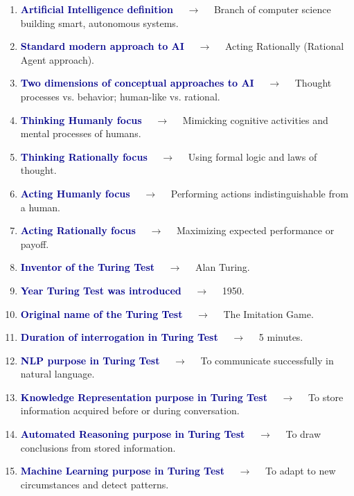 \documentclass[11pt,a4paper]{article}
\begin{document}
\begin{enumerate}[label=\arabic*., leftmargin=*, labelsep=0.8em, itemsep=0.35em, parsep=0.1em, topsep=0.2em]
  \item \textcolor{darkblue}{\textbf{Artificial Intelligence definition}} $\quad\to\quad$ Branch of computer science building smart, autonomous systems.
  \item \textcolor{darkblue}{\textbf{Standard modern approach to AI}} $\quad\to\quad$ Acting Rationally (Rational Agent approach).
  \item \textcolor{darkblue}{\textbf{Two dimensions of conceptual approaches to AI}} $\quad\to\quad$ Thought processes vs. behavior; human-like vs. rational.
  \item \textcolor{darkblue}{\textbf{Thinking Humanly focus}} $\quad\to\quad$ Mimicking cognitive activities and mental processes of humans.
  \item \textcolor{darkblue}{\textbf{Thinking Rationally focus}} $\quad\to\quad$ Using formal logic and laws of thought.
  \item \textcolor{darkblue}{\textbf{Acting Humanly focus}} $\quad\to\quad$ Performing actions indistinguishable from a human.
  \item \textcolor{darkblue}{\textbf{Acting Rationally focus}} $\quad\to\quad$ Maximizing expected performance or payoff.
  \item \textcolor{darkblue}{\textbf{Inventor of the Turing Test}} $\quad\to\quad$ Alan Turing.
  \item \textcolor{darkblue}{\textbf{Year Turing Test was introduced}} $\quad\to\quad$ 1950.
  \item \textcolor{darkblue}{\textbf{Original name of the Turing Test}} $\quad\to\quad$ The Imitation Game.
  \item \textcolor{darkblue}{\textbf{Duration of interrogation in Turing Test}} $\quad\to\quad$ 5 minutes.
  \item \textcolor{darkblue}{\textbf{NLP purpose in Turing Test}} $\quad\to\quad$ To communicate successfully in natural language.
  \item \textcolor{darkblue}{\textbf{Knowledge Representation purpose in Turing Test}} $\quad\to\quad$ To store information acquired before or during conversation.
  \item \textcolor{darkblue}{\textbf{Automated Reasoning purpose in Turing Test}} $\quad\to\quad$ To draw conclusions from stored information.
  \item \textcolor{darkblue}{\textbf{Machine Learning purpose in Turing Test}} $\quad\to\quad$ To adapt to new circumstances and detect patterns.

\end{enumerate}
\end{document}
